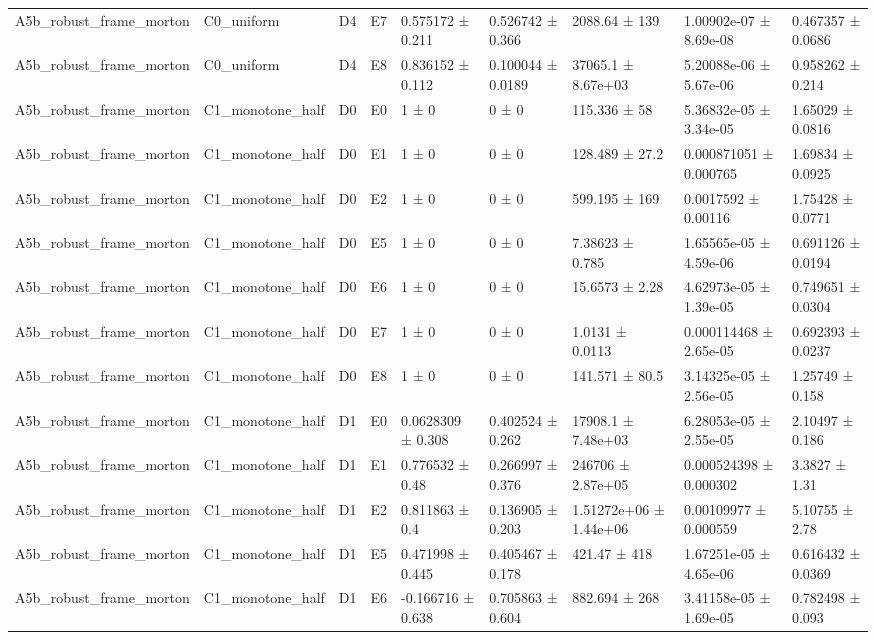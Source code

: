 \begin{table}
\begin{tabular}{lllllllll}
A5b\_robust\_frame\_morton & C0\_uniform & D4 & E7 & 0.575172 ± 0.211 & 0.526742 ± 0.366 & 2088.64 ± 139 & 1.00902e-07 ± 8.69e-08 & 0.467357 ± 0.0686 \\
A5b\_robust\_frame\_morton & C0\_uniform & D4 & E8 & 0.836152 ± 0.112 & 0.100044 ± 0.0189 & 37065.1 ± 8.67e+03 & 5.20088e-06 ± 5.67e-06 & 0.958262 ± 0.214 \\
A5b\_robust\_frame\_morton & C1\_monotone\_half & D0 & E0 & 1 ± 0 & 0 ± 0 & 115.336 ± 58 & 5.36832e-05 ± 3.34e-05 & 1.65029 ± 0.0816 \\
A5b\_robust\_frame\_morton & C1\_monotone\_half & D0 & E1 & 1 ± 0 & 0 ± 0 & 128.489 ± 27.2 & 0.000871051 ± 0.000765 & 1.69834 ± 0.0925 \\
A5b\_robust\_frame\_morton & C1\_monotone\_half & D0 & E2 & 1 ± 0 & 0 ± 0 & 599.195 ± 169 & 0.0017592 ± 0.00116 & 1.75428 ± 0.0771 \\
A5b\_robust\_frame\_morton & C1\_monotone\_half & D0 & E5 & 1 ± 0 & 0 ± 0 & 7.38623 ± 0.785 & 1.65565e-05 ± 4.59e-06 & 0.691126 ± 0.0194 \\
A5b\_robust\_frame\_morton & C1\_monotone\_half & D0 & E6 & 1 ± 0 & 0 ± 0 & 15.6573 ± 2.28 & 4.62973e-05 ± 1.39e-05 & 0.749651 ± 0.0304 \\
A5b\_robust\_frame\_morton & C1\_monotone\_half & D0 & E7 & 1 ± 0 & 0 ± 0 & 1.0131 ± 0.0113 & 0.000114468 ± 2.65e-05 & 0.692393 ± 0.0237 \\
A5b\_robust\_frame\_morton & C1\_monotone\_half & D0 & E8 & 1 ± 0 & 0 ± 0 & 141.571 ± 80.5 & 3.14325e-05 ± 2.56e-05 & 1.25749 ± 0.158 \\
A5b\_robust\_frame\_morton & C1\_monotone\_half & D1 & E0 & 0.0628309 ± 0.308 & 0.402524 ± 0.262 & 17908.1 ± 7.48e+03 & 6.28053e-05 ± 2.55e-05 & 2.10497 ± 0.186 \\
A5b\_robust\_frame\_morton & C1\_monotone\_half & D1 & E1 & 0.776532 ± 0.48 & 0.266997 ± 0.376 & 246706 ± 2.87e+05 & 0.000524398 ± 0.000302 & 3.3827 ± 1.31 \\
A5b\_robust\_frame\_morton & C1\_monotone\_half & D1 & E2 & 0.811863 ± 0.4 & 0.136905 ± 0.203 & 1.51272e+06 ± 1.44e+06 & 0.00109977 ± 0.000559 & 5.10755 ± 2.78 \\
A5b\_robust\_frame\_morton & C1\_monotone\_half & D1 & E5 & 0.471998 ± 0.445 & 0.405467 ± 0.178 & 421.47 ± 418 & 1.67251e-05 ± 4.65e-06 & 0.616432 ± 0.0369 \\
A5b\_robust\_frame\_morton & C1\_monotone\_half & D1 & E6 & -0.166716 ± 0.638 & 0.705863 ± 0.604 & 882.694 ± 268 & 3.41158e-05 ± 1.69e-05 & 0.782498 ± 0.093 \\

\end{tabular}
\end{table}
